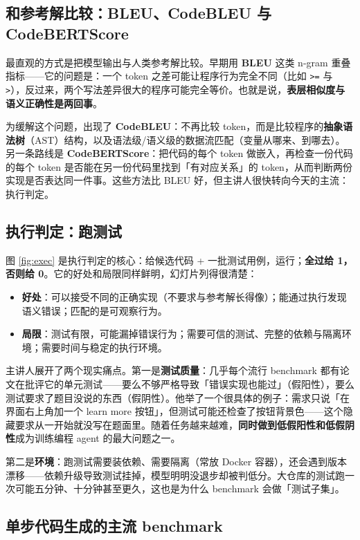 ﻿\documentclass[a4paper]{article}
\begin{document}
\subsection{和参考解比较：BLEU、CodeBLEU 与 CodeBERTScore}

最直观的方式是把模型输出与人类参考解比较。早期用 \textbf{BLEU} 这类 n-gram 重叠指标——它的问题是：一个 token 之差可能让程序行为完全不同（比如 \texttt{>=} 与 \texttt{>}），反过来，两个写法差异很大的程序可能完全等价。也就是说，\textbf{表层相似度与语义正确性是两回事}。

为缓解这个问题，出现了 \textbf{CodeBLEU}：不再比较 token，而是比较程序的\textbf{抽象语法树}（AST）结构，以及语法级/语义级的数据流匹配（变量从哪来、到哪去）。另一条路线是 \textbf{CodeBERTScore}：把代码的每个 token 做嵌入，再检查一份代码的每个 token 是否能在另一份代码里找到「有对应关系」的 token，从而判断两份实现是否表达同一件事。这些方法比 BLEU 好，但主讲人很快转向今天的主流：执行判定。

\subsection{执行判定：跑测试}

图 \ref{fig:exec} 是执行判定的核心：给候选代码 + 一批测试用例，运行；\textbf{全过给 1，否则给 0}。它的好处和局限同样鲜明，幻灯片列得很清楚：

\begin{itemize}
\item \textbf{好处}：可以接受不同的正确实现（不要求与参考解长得像）；能通过执行发现语义错误；匹配的是可观察行为。
\item \textbf{局限}：测试有限，可能漏掉错误行为；需要可信的测试、完整的依赖与隔离环境；需要时间与稳定的执行环境。
\end{itemize}

主讲人展开了两个现实痛点。第一是\textbf{测试质量}：几乎每个流行 benchmark 都有论文在批评它的单元测试——要么不够严格导致「错误实现也能过」（假阳性），要么测试要求了题目没说的东西（假阴性）。他举了一个很具体的例子：需求只说「在界面右上角加一个 learn more 按钮」，但测试可能还检查了按钮背景色——这个隐藏要求从一开始就没写在题面里。随着任务越来越难，\textbf{同时做到低假阳性和低假阴性}成为训练编程 agent 的最大问题之一。

第二是\textbf{环境}：跑测试需要装依赖、需要隔离（常放 Docker 容器），还会遇到版本漂移——依赖升级导致测试挂掉，模型明明没退步却被判低分。大仓库的测试跑一次可能五分钟、十分钟甚至更久，这也是为什么 benchmark 会做「测试子集」。

\subsection{单步代码生成的主流 benchmark}
\end{document}
